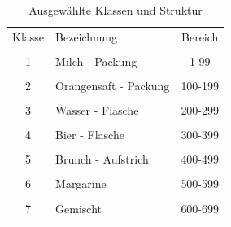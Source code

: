 \documentclass[a4paper,12pt,oneside]{article}
\begin{document}
\begin{table}
[h]
\centering
\caption{Ausgewählte Klassen und Struktur}
\begin{tabular}{|c|l|c|}
 
   Klasse   &   Bezeichnung   &   Bereich   \\
 & & \\
   1   &   Milch - Packung   &   1-99   \\
 & & \\
   2   &   Orangensaft - Packung   &   100-199   \\
 & & \\
   3   &   Wasser - Flasche   &   200-299   \\
 & & \\
   4   &   Bier - Flasche   &   300-399   \\
 & & \\
   5   &   Brunch - Aufstrich   &   400-499   \\
 & & \\
   6   &   Margarine   &   500-599   \\
 & & \\
   7   &   Gemischt   &   600-699
 
\end{tabular}
\end{table}

\vspace{1 cm}
\end{document}
